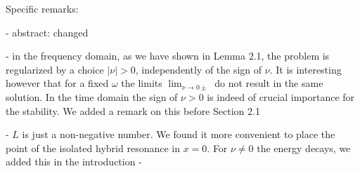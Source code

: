 \documentclass[a4paper,10pt]{article}
\begin{document}
Specific remarks: 

- abstract: changed

- in the frequency domain, as we have shown in Lemma 2.1, the problem is regularized by a choice $|\nu|>0$, independently of the sign of $\nu$. 
It is interesting however that for a fixed $\omega$ the limits $\lim_{\nu\rightarrow 0\pm}$ do not result in the same solution. 
In the time domain the sign of $\nu>0$ is indeed of crucial importance for the stability. We added a remark on this before Section 2.1  

- $L$ is just a non-negative number. We found it more convenient to place the point of the isolated hybrid resonance in $x=0$.
For $\nu\neq 0$ the energy decays, we added this in the introduction
-
 
\end{document}
